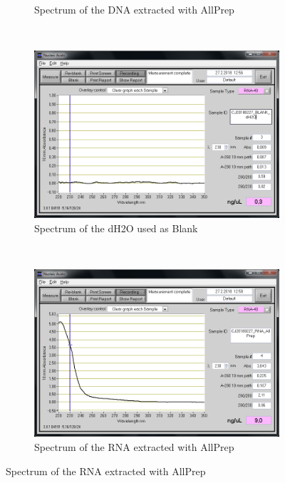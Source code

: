 \begin{figure}[H]
\begin{subfigure}[b]{0.49\textwidth}
        \caption{Spectrum of the DNA extracted with AllPrep}
        \label{sfig:CJ20180227_DNA_AllPrep}
    \end{subfigure}
    \\
    \begin{subfigure}[b]{0.49\textwidth}
        \includegraphics[width=\textwidth]{graphics/screenshots/CJ20180227_BLANK_dH2O.png}
        \caption{Spectrum of the dH2O used as Blank}
        \label{sfig:CJ20180227_BLANK_dH2O}
    \end{subfigure}
    ~ 
    \begin{subfigure}[b]{0.49\textwidth}
        \includegraphics[width=\textwidth]{graphics/screenshots/CJ20180227_RNA_AllPrep.png}
        \caption{Spectrum of the RNA extracted with AllPrep}
        \label{sfig:slabel2}
    \end{subfigure}
\end{figure}